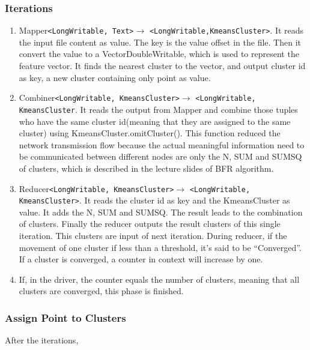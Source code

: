 \documentclass[a4paper,11pt]{article}
\begin{document}
\subsubsection{Iterations}
\begin{enumerate}
  \item Mapper\verb|<LongWritable, Text>|$\rightarrow$
  \verb|<LongWritable,KmeansCluster>|. It reads the input file content as value.
  The key is the value offset in the file. Then it convert the value to a
  VectorDoubleWritable, which is used to represent the feature vector. It finds
  the nearest cluster to the vector, and output cluster id as key, a new cluster
  containing only point as value.
  \item Combiner\verb|<LongWritable, KmeansCluster>|$\rightarrow$
  \verb|<LongWritable, KmeansCluster|. It reads the output from Mapper and
  combine those tuples who have the same cluster id(meaning that they are
  assigned to the same cluster) using KmeansCluster.omitCluster(). This function
  reduced the network transmission flow because the actual meaningful
  information need to be communicated between different nodes are only the N,
  SUM and SUMSQ of clusters, which is described in the lecture slides of BFR algorithm.
  \item Reducer\verb|<LongWritable, KmeansCluster>|$\rightarrow$
  \verb|<LongWritable, KmeansCluster>|. It reads the cluster id as key and the
  KmeansCluster as value. It adds the N, SUM and SUMSQ. The result leads to the
  combination of clusters. Finally the reducer outputs the result clusters of
  this single iteration. This clusters are input of next iteration. During
  reducer, if the movement of one cluster if less than a threshold, it's said
  to be ``Converged''. If a cluster is converged, a counter in context will
  increase by one.
  \item If, in the driver, the counter equals the number of clusters, meaning
  that all clusters are converged, this phase is finished.
\end{enumerate} 
\subsubsection{Assign Point to Clusters}
After the iterations, 



\end{document}
